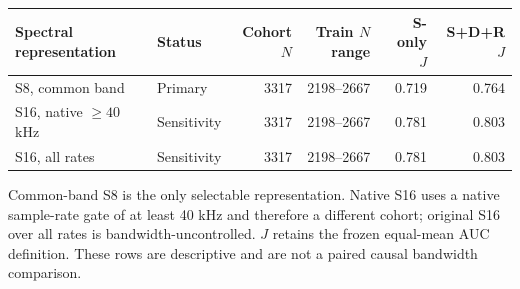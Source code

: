 \begin{tabular}{llrrrr}
\toprule
Spectral representation & Status & Cohort $N$ & Train $N$ range & S-only $J$ & S+D+R $J$ \\
\midrule
S8, common band & Primary & 3317 & 2198--2667 & 0.719 & 0.764 \\
S16, native $\geq 40$ kHz & Sensitivity & 3317 & 2198--2667 & 0.781 & 0.803 \\
S16, all rates & Sensitivity & 3317 & 2198--2667 & 0.781 & 0.803 \\
\bottomrule
\end{tabular}
\par\smallskip
{\footnotesize Common-band S8 is the only selectable representation. Native S16 uses a native sample-rate gate of at least 40 kHz and therefore a different cohort; original S16 over all rates is bandwidth-uncontrolled. $J$ retains the frozen equal-mean AUC definition. These rows are descriptive and are not a paired causal bandwidth comparison.}

